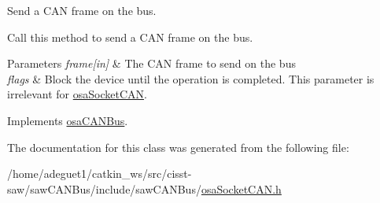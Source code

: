Send a C\-A\-N frame on the bus. 

Call this method to send a C\-A\-N frame on the bus. 
\begin{DoxyParams}{Parameters}
{\em frame\mbox{[}in\mbox{]}} & The C\-A\-N frame to send on the bus \\
\hline
{\em flags} & Block the device until the operation is completed. This parameter is irrelevant for \hyperlink{classosa_socket_c_a_n}{osa\-Socket\-C\-A\-N}. \\
\hline
\end{DoxyParams}


Implements \hyperlink{classosa_c_a_n_bus_a21b88fd2a857089845305d1e2eabb5b9}{osa\-C\-A\-N\-Bus}.



The documentation for this class was generated from the following file\-:\begin{DoxyCompactItemize}
\item 
/home/adeguet1/catkin\-\_\-ws/src/cisst-\/saw/saw\-C\-A\-N\-Bus/include/saw\-C\-A\-N\-Bus/\hyperlink{osa_socket_c_a_n_8h}{osa\-Socket\-C\-A\-N.\-h}\end{DoxyCompactItemize}
